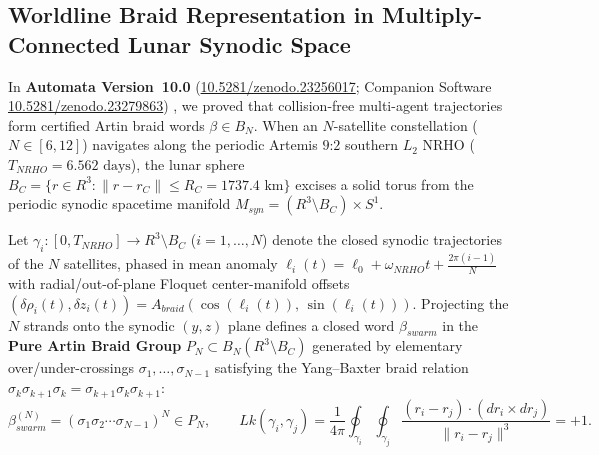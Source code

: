 \documentclass[11pt,a4paper,reqno]{article}
\def\bm#1{#1}%
\def\texttt#1{#1}%
\def\mathrm#1{#1}%
\def\mathcal#1{#1}%
\def\mathbb#1{#1}%
\newcommand{\zenodo}[1]{\href{https://doi.org/10.5281/zenodo.#1}{\texttt{10.5281/\allowbreak zenodo.#1}}}
\theoremstyle{plain}
\theoremstyle{definition}
\theoremstyle{remark}
\numberwithin{equation}{section}
\begin{document}
\subsection{Worldline Braid Representation in Multiply-Connected Lunar Synodic Space}
In \textbf{Automata Version~10.0} (\zenodo{23256017}; Companion Software \zenodo{23279863}) \cite{UnmaniAutomata100}, we proved that collision-free multi-agent trajectories form certified Artin braid words $\beta \in \mathcal{B}_N$. When an $N$-satellite constellation ($N \in [6, 12]$) navigates along the periodic Artemis $9\text{:}2$ southern $L_2$ NRHO ($T_{\mathrm{NRHO}} = 6.562\text{ days}$), the lunar sphere $\mathcal{B}_{\mathbb{C}} = \{\bm{r} \in \mathbb{R}^3 : \|\bm{r} - \bm{r}_{\mathbb{C}}\| \le R_{\mathbb{C}} = 1737.4\text{ km}\}$ excises a solid torus from the periodic synodic spacetime manifold $\mathcal{M}_{\mathrm{syn}} = (\mathbb{R}^3 \setminus \mathcal{B}_{\mathbb{C}}) \times S^1$.

Let $\bm{\gamma}_i : [0, T_{\mathrm{NRHO}}] \to \mathbb{R}^3 \setminus \mathcal{B}_{\mathbb{C}}$ ($i = 1, \dots, N$) denote the closed synodic trajectories of the $N$ satellites, phased in mean anomaly $\ell_i(t) = \ell_0 + \omega_{\mathrm{NRHO}} t + \frac{2\pi(i-1)}{N}$ with radial/out-of-plane Floquet center-manifold offsets $(\delta\rho_i(t), \delta z_i(t)) = A_{\mathrm{braid}}\!\left(\cos(\ell_i(t)),\, \sin(\ell_i(t))\right)$. Projecting the $N$ strands onto the synodic $(y, z)$ plane defines a closed word $\beta_{\mathrm{swarm}}$ in the \textbf{Pure Artin Braid Group} $\mathcal{P}_N \subset \mathcal{B}_N(\mathbb{R}^3 \setminus \mathcal{B}_{\mathbb{C}})$ generated by elementary over/under-crossings $\sigma_1, \dots, \sigma_{N-1}$ satisfying the Yang--Baxter braid relation $\sigma_k \sigma_{k+1} \sigma_k = \sigma_{k+1} \sigma_k \sigma_{k+1}$:
\begin{equation}
  \beta_{\mathrm{swarm}}^{(N)} = \left( \sigma_1 \sigma_2 \cdots \sigma_{N-1} \right)^N \in \mathcal{P}_N, \qquad \mathrm{Lk}(\bm{\gamma}_i, \bm{\gamma}_j) = \frac{1}{4\pi}\oint_{\bm{\gamma}_i}\oint_{\bm{\gamma}_j} \frac{(\bm{r}_i - \bm{r}_j) \cdot (\mathrm{d}\bm{r}_i \times \mathrm{d}\bm{r}_j)}{\|\bm{r}_i - \bm{r}_j\|^3} = +1.
  \label{eq:cislunar_gauss_linking}
\end{equation}
\end{document}
